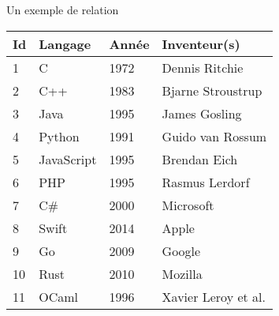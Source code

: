\documentclass[10pt]{beamer}
\begin{document}
\begin{frame}[fragile]{\Ctitle}{\stitle}
	\begin{exampleblock}{Un exemple de relation}
		\begin{tabular}{|l|l|l|l|}
			\hline
			\textbf{Id} & \textbf{Langage} & \textbf{Année} & \textbf{Inventeur(s)} \\
			\hline
			1           & C                & 1972           & Dennis Ritchie        \\
			\hline
			2           & C++              & 1983           & Bjarne Stroustrup     \\
			\hline
			3           & Java             & 1995           & James Gosling         \\
			\hline
			4           & Python           & 1991           & Guido van Rossum      \\
			\hline
			5           & JavaScript       & 1995           & Brendan Eich          \\
			\hline
			6           & PHP              & 1995           & Rasmus Lerdorf        \\
			\hline
			7           & C\#              & 2000           & Microsoft             \\
			\hline
			8           & Swift            & 2014           & Apple                 \\
			\hline
			9           & Go               & 2009           & Google                \\
			\hline
			10          & Rust             & 2010           & Mozilla               \\
			\hline
			11          & OCaml            & 1996           & Xavier Leroy et al.   \\
			\hline
		\end{tabular}
	\end{exampleblock}
\end{frame}
\end{document}
